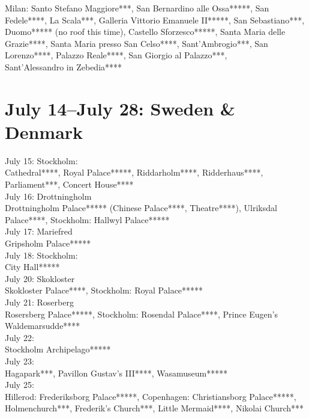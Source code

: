 Milan: Santo Stefano Maggiore***, San Bernardino alle Ossa*****, San Fedele****, La Scala***, Galleria Vittorio Emanuele II*****, San Sebastiano***, Duomo***** (no roof this time), Castello Sforzesco*****, Santa Maria delle Grazie****, Santa Maria presso San Celso****, Sant'Ambrogio***, San Lorenzo****, Palazzo Reale****, San Giorgio al Palazzo***,\\ Sant'Alessandro in Zebedia****

\section{July 14--July 28: Sweden \& Denmark}
\label{2013:SwedenDenmark}

July 15: Stockholm:\\
Cathedral****, Royal Palace*****, Riddarholm****, Ridderhaus****, Parliament***, Concert House****\\

July 16: Drottningholm\\
Drottningholm Palace***** (Chinese Palace****, Theatre****), Ulriksdal Palace****, Stockholm: Hallwyl Palace*****\\

July 17: Mariefred\\
Gripsholm Palace*****\\

July 18: Stockholm:\\
City Hall*****\\

July 20: Skokloster\\
Skokloster Palace****, Stockholm: Royal Palace*****\\

July 21: Roserberg\\
Rosersberg Palace*****, Stockholm: Rosendal Palace****, Prince Eugen's Waldemarsudde****\\

July 22:\\
Stockholm Archipelago*****\\

July 23:\\
Hagapark***, Pavillon Gustav's III****, Wasamuseum*****\\

July 25:\\
Hillerod: Frederiksborg Palace*****, Copenhagen: Christiansborg Palace*****, Holmenchurch***, Frederik's Church***, Little Mermaid****, Nikolai Church***\\

